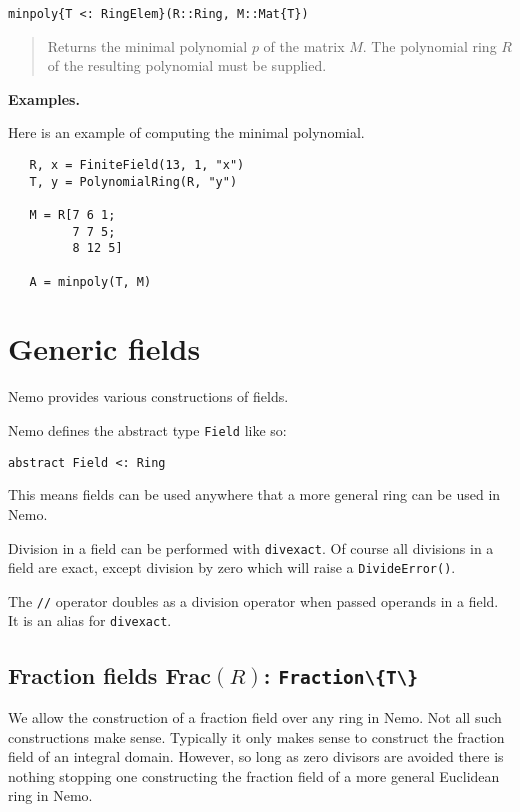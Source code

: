 \documentclass[a4paper,10pt]{article}
\newcommand{\code}{\lstinline}
\newcommand{\desc}[1]{\vspace{-3mm}\begin{quote}#1\end{quote}}
\begin{document}
\begin{lstlisting}
minpoly{T <: RingElem}(R::Ring, M::Mat{T})
\end{lstlisting}

\desc{Returns the minimal polynomial $p$ of the matrix $M$. The
polynomial ring $R$ of the resulting polynomial must be supplied.}

\textbf{Examples.}

Here is an example of computing the minimal polynomial.

\begin{lstlisting}
   R, x = FiniteField(13, 1, "x")
   T, y = PolynomialRing(R, "y")
   
   M = R[7 6 1;
         7 7 5;
         8 12 5]

   A = minpoly(T, M)
\end{lstlisting}

\section{Generic fields}

Nemo provides various constructions of fields. 

Nemo defines the abstract type \code{Field} like so:

\begin{lstlisting}
abstract Field <: Ring
\end{lstlisting}

This means fields can be used anywhere that a more general ring can be used
in Nemo.

Division in a field can be performed with \code{divexact}. Of course all
divisions in a field are exact, except division by zero which will raise
a \code{DivideError()}.

The \code{//} operator doubles as a division operator when passed operands
in a field. It is an alias for \code{divexact}.

\subsection{Fraction fields Frac$(R)$: \code|Fraction\{T\}|}

We allow the construction of a fraction field over any ring in Nemo. Not all
such constructions make sense. Typically it only makes sense to construct the
fraction field of an integral domain. However, so long as zero divisors are
avoided there is nothing stopping one constructing the fraction field of a
more general Euclidean ring in Nemo.
\end{document}
